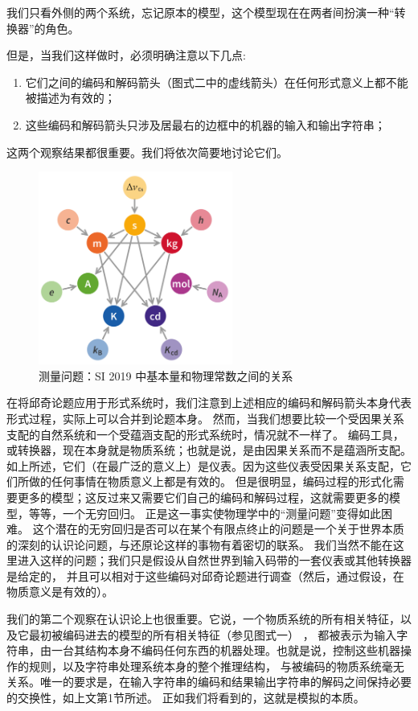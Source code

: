 \documentclass[a4paper,12pt]{article}
\begin{document}
我们只看外侧的两个系统，忘记原本的模型，这个模型现在在两者间扮演一种“转换器”的角色。

但是，当我们这样做时，必须明确注意以下几点:
\begin{enumerate}[label=(\alph*)]
\item 它们之间的编码和解码箭头（图式二中的虚线箭头）在任何形式意义上都不能被描述为有效的；
\item 这些编码和解码箭头只涉及居最右的边框中的机器的输入和输出字符串；
\end{enumerate}
这两个观察结果都很重要。我们将依次简要地讨论它们。

\begin{figure}[ht]
\centering
\includegraphics[height=2.5in]{images/unit_relations_SI.png}
\caption{测量问题：SI 2019 中基本量和物理常数之间的关系}
\end{figure}

在将邱奇论题应用于形式系统时，我们注意到上述相应的编码和解码箭头本身代表形式过程，实际上可以合并到论题本身。
然而，当我们想要比较一个受因果关系支配的自然系统和一个受蕴涵支配的形式系统时，情况就不一样了。
编码工具，或转换器，现在本身就是物质系统；也就是说，是由因果关系而不是蕴涵所支配。
如上所述，它们（在最广泛的意义上）是仪表。因为这些仪表受因果关系支配，它们所做的任何事情在物质意义上都是有效的。
但是很明显，编码过程的形式化需要更多的模型；这反过来又需要它们自己的编码和解码过程，这就需要更多的模型，等等，一个无穷回归。
正是这一事实使物理学中的“测量问题”变得如此困难。
这个潜在的无穷回归是否可以在某个有限点终止的问题是一个关于世界本质的深刻的认识论问题，与还原论这样的事物有着密切的联系。
我们当然不能在这里进入这样的问题；我们只是假设从自然世界到输入码带的一套仪表或其他转换器是给定的，
并且可以相对于这些编码对邱奇论题进行调查（然后，通过假设，在物质意义是有效的）。

我们的第二个观察在认识论上也很重要。它说，一个物质系统的所有相关特征，以及它最初被编码进去的模型的所有相关特征（参见图式一） ，
都被表示为输入字符串，由一台其结构本身不编码任何东西的机器处理。也就是说，控制这些机器操作的规则，以及字符串处理系统本身的整个推理结构，
与被编码的物质系统毫无关系。唯一的要求是，在输入字符串的编码和结果输出字符串的解码之间保持必要的交换性，如上文第1节所述。
正如我们将看到的，这就是模拟的本质。
\end{document}
